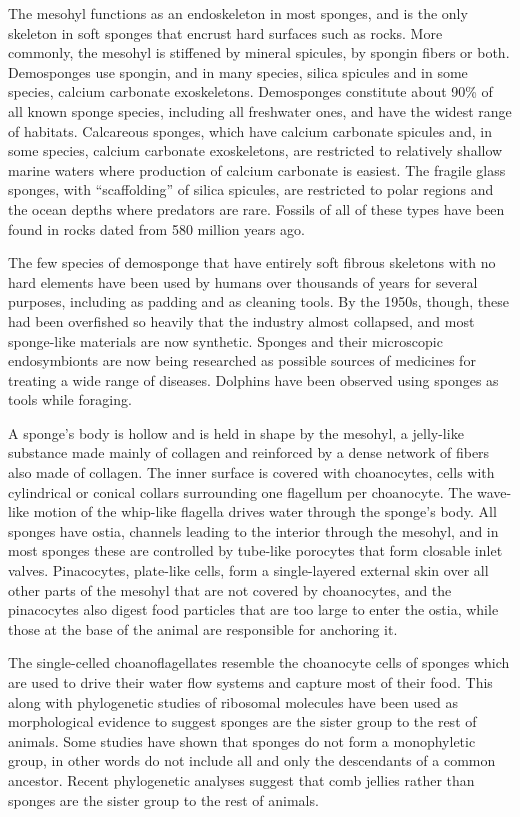 The mesohyl functions as an endoskeleton in most sponges, and is the
only skeleton in soft sponges that encrust hard surfaces such as rocks.
More commonly, the mesohyl is stiffened by mineral spicules, by spongin
fibers or both. Demosponges use spongin, and in many species, silica
spicules and in some species, calcium carbonate exoskeletons.
Demosponges constitute about 90\% of all known sponge species, including
all freshwater ones, and have the widest range of habitats. Calcareous
sponges, which have calcium carbonate spicules and, in some species,
calcium carbonate exoskeletons, are restricted to relatively shallow
marine waters where production of calcium carbonate is easiest. The
fragile glass sponges, with ``scaffolding'' of silica spicules, are
restricted to polar regions and the ocean depths where predators are
rare. Fossils of all of these types have been found in rocks dated from
580 million years ago.

The few species of demosponge that have entirely soft fibrous skeletons
with no hard elements have been used by humans over thousands of years
for several purposes, including as padding and as cleaning tools. By the
1950s, though, these had been overfished so heavily that the industry
almost collapsed, and most sponge-like materials are now synthetic.
Sponges and their microscopic endosymbionts are now being researched as
possible sources of medicines for treating a wide range of diseases.
Dolphins have been observed using sponges as tools while foraging.

A sponge's body is hollow and is held in shape by the mesohyl, a
jelly-like substance made mainly of collagen and reinforced by a dense
network of fibers also made of collagen. The inner surface is covered
with choanocytes, cells with cylindrical or conical collars surrounding
one flagellum per choanocyte. The wave-like motion of the whip-like
flagella drives water through the sponge's body. All sponges have ostia,
channels leading to the interior through the mesohyl, and in most
sponges these are controlled by tube-like porocytes that form closable
inlet valves. Pinacocytes, plate-like cells, form a single-layered
external skin over all other parts of the mesohyl that are not covered
by choanocytes, and the pinacocytes also digest food particles that are
too large to enter the ostia, while those at the base of the animal are
responsible for anchoring it.

The single-celled choanoflagellates resemble the choanocyte cells of
sponges which are used to drive their water flow systems and capture
most of their food. This along with phylogenetic studies of ribosomal
molecules have been used as morphological evidence to suggest sponges
are the sister group to the rest of animals. Some studies have shown
that sponges do not form a monophyletic group, in other words do not
include all and only the descendants of a common ancestor. Recent
phylogenetic analyses suggest that comb jellies rather than sponges are
the sister group to the rest of animals.

